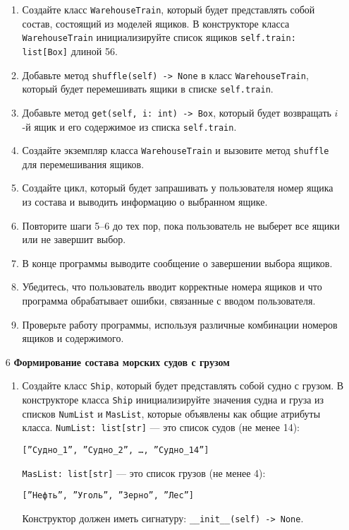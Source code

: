 \begin{enumerate}
\begin{enumerate}
    \item Создайте класс \texttt{WarehouseTrain}, который будет представлять собой состав, состоящий из моделей ящиков. В конструкторе класса \texttt{WarehouseTrain} инициализируйте список ящиков \texttt{self.train: list[Box]} длиной 56.

    \item Добавьте метод \texttt{shuffle(self) -> None} в класс \texttt{WarehouseTrain}, который будет перемешивать ящики в списке \texttt{self.train}.

    \item Добавьте метод \texttt{get(self, i: int) -> Box}, который будет возвращать $i$-й ящик и его содержимое из списка \texttt{self.train}.

    \item Создайте экземпляр класса \texttt{WarehouseTrain} и вызовите метод \texttt{shuffle} для перемешивания ящиков.

    \item Создайте цикл, который будет запрашивать у пользователя номер ящика из состава и выводить информацию о выбранном ящике.

    \item Повторите шаги 5–6 до тех пор, пока пользователь не выберет все ящики или не завершит выбор.

    \item В конце программы выводите сообщение о завершении выбора ящиков.

    \item Убедитесь, что пользователь вводит корректные номера ящиков и что программа обрабатывает ошибки, связанные с вводом пользователя.

    \item Проверьте работу программы, используя различные комбинации номеров ящиков и содержимого.
\end{enumerate}

\item[6] \textbf{Формирование состава морских судов с грузом}
\begin{enumerate}
    \item Создайте класс \texttt{Ship}, который будет представлять собой судно с грузом. В конструкторе класса \texttt{Ship} инициализируйте значения судна и груза из списков \texttt{NumList} и \texttt{MasList}, которые объявлены как общие атрибуты класса. \texttt{NumList: list[str]} — это список судов (не менее 14): 
    \begin{center}
        \texttt{[''Судно\_1'', ''Судно\_2'', \dots, ''Судно\_14'']}
    \end{center}
    \texttt{MasList: list[str]} — это список грузов (не менее 4):
    \begin{center}
        \texttt{[''Нефть'', ''Уголь'', ''Зерно'', ''Лес'']}
    \end{center}
    Конструктор должен иметь сигнатуру: \texttt{\_\_init\_\_(self) -> None}.


\end{enumerate}
\end{enumerate}
